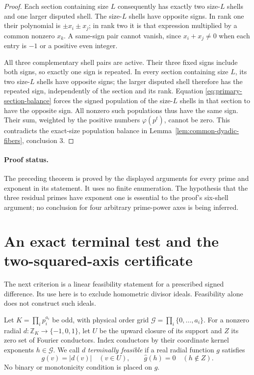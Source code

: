 \documentclass[11pt]{article}
\numberwithin{equation}{section}
\theoremstyle{definition}
\theoremstyle{remark}
\begin{document}
\begin{proof}
Each section containing size \(L\) consequently has exactly two
size-\(L\) shells and one larger disputed shell. The size-\(L\)
shells have opposite signs. In rank one their polynomial is
\(\pm x_i\pm x_j\); in rank two it is that expression multiplied
by a common nonzero \(x_k\). A same-sign pair cannot vanish, since
\(x_i+x_j\ne0\) when each entry is \(-1\) or a positive even
integer.

All three complementary shell pairs are active. Their three fixed
signs include both signs, so exactly one sign is repeated. In every
section containing size \(L\), its two size-\(L\) shells have
opposite signs; the larger disputed shell therefore has the repeated
sign, independently of the section and its rank. Equation
\eqref{eq:primary-section-balance} forces the signed population of
the size-\(L\) shells in that section to have the opposite sign.
All nonzero such populations thus have the same sign. Their sum,
weighted by the positive numbers \(\varphi(p^t)\), cannot be zero.
This contradicts the exact-size population balance in
Lemma~\ref{lem:common-dyadic-fibers}, conclusion 3.
\end{proof}

\paragraph{Proof status.}
The preceding theorem is proved by the displayed arguments for every
prime and exponent in its statement. It uses no finite enumeration.
The hypothesis that the three residual primes have exponent one is
essential to the proof's six-shell argument; no conclusion for four
arbitrary prime-power axes is being inferred.



\section{An exact terminal test and the two-squared-axis certificate}
\label{subsec:terminal-grid-certificate}

The next criterion is a linear feasibility statement for a prescribed
signed difference. Its use here is to exclude homometric divisor ideals.
Feasibility alone does not construct such ideals.

Let \(K=\prod_i p_i^{a_i}\) be odd, with physical order grid
\(\mathcal G=\prod_i\{0,\ldots,a_i\}\). For a nonzero radial
\(d:\mathbb Z_K\to\{-1,0,1\}\), let \(U\) be the upward closure
of its support and \(Z\) its zero set of Fourier conductors. Index
conductors by their coordinate kernel exponents \(h\in\mathcal G\).
We call \(d\) \emph{terminally feasible} if a real radial function
\(g\) satisfies
\begin{equation}
g(v)=|d(v)|\quad(v\in U),\qquad
\widehat g(h)=0\quad(h\notin Z).
\label{eq:terminal-feasibility}
\end{equation}
No binary or monotonicity condition is placed on \(g\).
\end{document}
